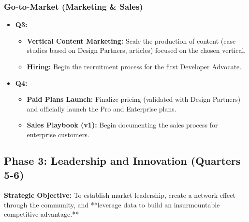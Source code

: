 \documentclass[11pt, a4paper, oneside]{article}
\begin{document}
\subsubsection*{Go-to-Market (Marketing \& Sales)}
\begin{itemize}[leftmargin=*]
    \item \textbf{Q3:}
    \begin{itemize}
        \item \textbf{Vertical Content Marketing:} Scale the production of content (case studies based on Design Partners, articles) focused on the chosen vertical.
        \item \textbf{Hiring:} Begin the recruitment process for the first Developer Advocate.
    \end{itemize}
    \item \textbf{Q4:}
    \begin{itemize}
        \item \textbf{Paid Plans Launch:} Finalize pricing (validated with Design Partners) and officially launch the Pro and Enterprise plans.
        \item \textbf{Sales Playbook (v1):} Begin documenting the sales process for enterprise customers.
    \end{itemize}
\end{itemize}

\clearpage

\subsection{Phase 3: Leadership and Innovation (Quarters 5-6)}
\textbf{Strategic Objective:} To establish market leadership, create a network effect through the community, and **leverage data to build an insurmountable competitive advantage.**
\end{document}
